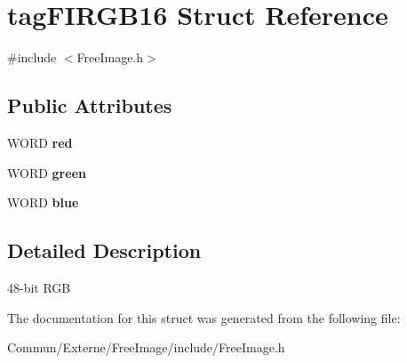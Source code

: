 \hypertarget{structtag_f_i_r_g_b16}{}\section{tag\+F\+I\+R\+G\+B16 Struct Reference}
\label{structtag_f_i_r_g_b16}


{\ttfamily \#include $<$Free\+Image.\+h$>$}

\subsection*{Public Attributes}
\begin{DoxyCompactItemize}
\item 
W\+O\+RD {\bfseries red}\hypertarget{structtag_f_i_r_g_b16_aeaa2393246d6482c02cac30d169ee022}{}\label{structtag_f_i_r_g_b16_aeaa2393246d6482c02cac30d169ee022}

\item 
W\+O\+RD {\bfseries green}\hypertarget{structtag_f_i_r_g_b16_a00e213246943f0a47698fdd0d51f9924}{}\label{structtag_f_i_r_g_b16_a00e213246943f0a47698fdd0d51f9924}

\item 
W\+O\+RD {\bfseries blue}\hypertarget{structtag_f_i_r_g_b16_ae9de217a4d3c01c533bc8e727c0ec0eb}{}\label{structtag_f_i_r_g_b16_ae9de217a4d3c01c533bc8e727c0ec0eb}

\end{DoxyCompactItemize}


\subsection{Detailed Description}
48-\/bit R\+GB 

The documentation for this struct was generated from the following file\+:\begin{DoxyCompactItemize}
\item 
Commun/\+Externe/\+Free\+Image/include/Free\+Image.\+h\end{DoxyCompactItemize}
